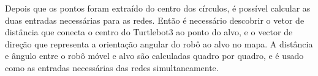 Depois que os pontos foram extraído do centro dos círculos, é possível calcular as duas entradas necessárias para as redes.
Então é necessário descobrir o vetor de distância que conecta o centro do Turtlebot3 ao ponto do alvo, e o vector de direção que representa a orientação angular do robô ao alvo no mapa.
A distância e ângulo entre o robô móvel e alvo são calculadas quadro por quadro, e é usado como as entradas necessárias das redes simultaneamente.









